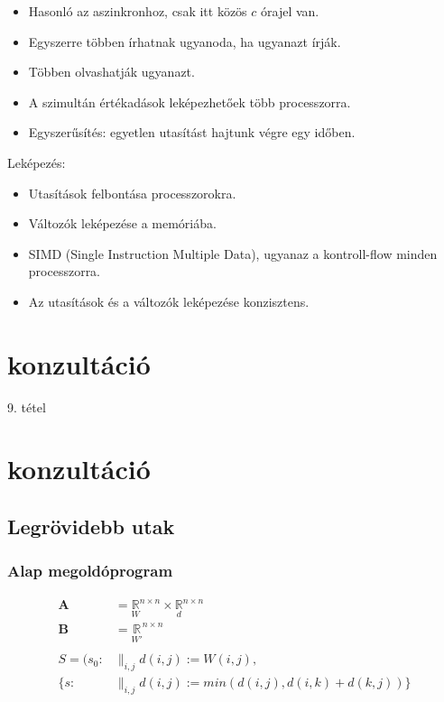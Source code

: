 \documentclass[12pt]{article}
\begin{document}
	\begin{itemize}
		\item Hasonló az aszinkronhoz, csak itt közös $c$ órajel van.
		\item Egyszerre többen írhatnak ugyanoda, ha ugyanazt írják.
		\item Többen olvashatják ugyanazt.
		\item A szimultán értékadások leképezhetőek több processzorra.
		\item Egyszerűsítés: egyetlen utasítást hajtunk végre egy időben.
	\end{itemize}
	
	Leképezés:
	\begin{itemize}
		\item Utasítások felbontása processzorokra.
		\item Változók leképezése a memóriába.
		\item SIMD (Single Instruction Multiple Data), ugyanaz a kontroll-flow minden processzorra.
		\item Az utasítások és a változók leképezése konzisztens.
	\end{itemize}



	\newpage
	\section{konzultáció}
	9. tétel
	
	\section{konzultáció}
	\subsection{Legrövidebb utak}
	\subsubsection{Alap megoldóprogram}
	\begin{align*}
	\textbf{A} &= \underset{W}{\mathbb{R}}^{n \times n} \times \underset{d}{\mathbb{R}}^{n \times n} \\
	\textbf{B} &= \underset{W'}{\mathbb{R}}^{n \times n} \\
	\\
	S = ( s_0: &\mathop{\parallel}_{i,j} d(i,j) := W(i,j), \\
	\{ s: &\mathop{\parallel}_{i,j} d(i,j) := min(d(i,j), d(i,k) + d(k,j) ) \} \\
	\end{align*}
	
\end{document}
